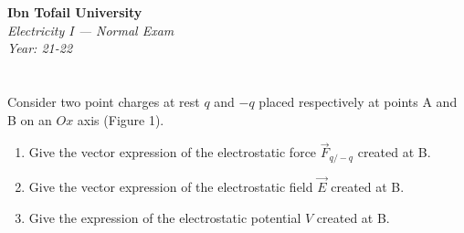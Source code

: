\documentclass[12pt]{article}
\begin{document}
\begin{center}
  \Large\textbf{Ibn Tofail University} \\[1em]
  \large\textit{Electricity I — Normal Exam} \\[0.5em]
  \large\textit{Year: 21-22} \\[2em]
\end{center}

\vspace{0.5cm}

\section{}
Consider two point charges at rest $q$ and $-q$ placed respectively at points A and B on an $Ox$ axis (Figure 1).

\begin{figure}[H]
    \centering
    \caption{}
\end{figure}



\begin{enumerate}
\item Give the vector expression of the electrostatic force $\vec{F}_{q/-q}$ created at B.
\item Give the vector expression of the electrostatic field $\vec{E}$ created at B.
\item Give the expression of the electrostatic potential $V$ created at B.
\end{enumerate}

\newpage
\end{document}
